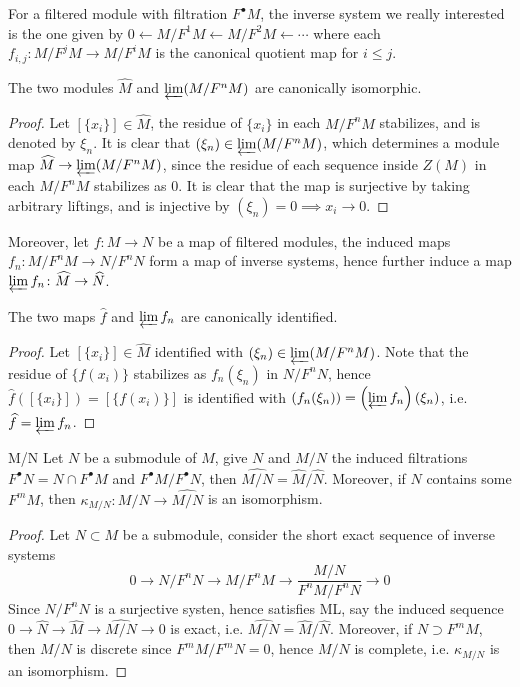 \documentclass[10pt]{extarticle}
\begin{document}
For a filtered module with filtration $F^\bullet M$, the inverse system we really interested is the one given by $0\gets M/F^1M\gets M/F^2M\gets\cdots$ where each $f_{i,j}\colon M/F^jM\to M/F^iM$ is the canonical quotient map for $i\leq j$. 

\begin{proposition}{}{}
    The two modules $\widehat{M}$ and $\varprojlim(M/F^nM)$ are canonically isomorphic.
\end{proposition}
\begin{proof}
    Let $[\{x_i\}]\in \widehat{M}$, the residue of $\{x_i\}$ in each $M/F^nM$ stabilizes, and is denoted by $\xi_n$. It is clear that $(\xi_n)\in\varprojlim(M/F^nM)$, which determines a module map $\widehat{M}\to\varprojlim(M/F^nM)$, since the residue of each sequence inside $Z(M)$ in each $M/F^nM$ stabilizes as $0$. It is clear that the map is surjective by taking arbitrary liftings, and is injective by $(\xi_n)=0\implies x_i\to 0$.
\end{proof}

Moreover, let $f\colon M\to N$ be a map of filtered modules, the induced maps $f_n\colon M/F^nM\to N/F^nN$ form a map of inverse systems, hence further induce a map $\varprojlim f_n\colon \widehat{M}\to \widehat{N}$.

\begin{proposition}{}{}
    The two maps $\widehat{f}$ and $\varprojlim f_n$ are canonically identified.
\end{proposition}

\begin{proof}
    Let $[\{x_i\}]\in \widehat{M}$ identified with $(\xi_n)\in\varprojlim(M/F^nM)$. Note that the residue of $\{f(x_i)\}$ stabilizes as $f_n(\xi_n)$ in $N/F^nN$, hence $\widehat{f}([\{x_i\}])=[\{f(x_i)\}]$ is identified with $(f_n(\xi_n))=\left(\varprojlim f_n\right)(\xi_n)$, i.e. $\widehat{f}=\varprojlim f_n$.
\end{proof}

\begin{proposition}{}{M/N}
    Let $N$ be a submodule of $M$, give $N$ and $M/N$ the induced filtrations $F^\bullet N=N\cap F^\bullet M$ and $F^\bullet M/F^\bullet N$, then $\widehat{M/N}=\widehat{M}/\widehat{N}$. Moreover, if $N$ contains some $F^mM$, then $\kappa_{M/N}\colon M/N\to\widehat{M/N}$ is an isomorphism.
\end{proposition}
\begin{proof}
    Let $N\subset M$ be a submodule, consider the short exact sequence of inverse systems
    \[
    0\to N/F^nN\to M/F^nM\to \frac{M/N}{F^nM/F^nN}\to 0
    \]
    Since $N/F^nN$ is a  surjective systen, hence satisfies ML, say the induced sequence $0\to \widehat{N}\to \widehat{M}\to \widehat{M/N}\to 0$ is exact, i.e. $\widehat{M/N}=\widehat{M}/\widehat{N}$. Moreover, if $N\supset F^mM$, then $M/N$ is discrete since $F^mM/F^mN=0$, hence $M/N$ is complete, i.e. $\kappa_{M/N}$ is an isomorphism.
\end{proof}
\end{document}
